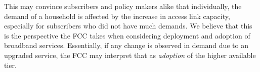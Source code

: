 This may 
convince subscribers and policy makers alike that individually, the demand of a 
household is affected by the increase in access link capacity, especially for 
subscribers who did not have much demands. We believe that this is the 
perspective the FCC takes when considering deployment and adoption of 
broadband services. Essentially, if any change is observed in demand due to an 
upgraded service, the FCC may interpret that as \emph{adoption} of the higher 
available tier.
\fi